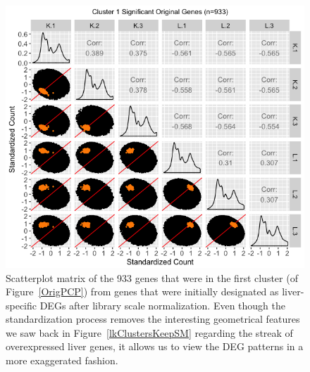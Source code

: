 \documentclass{article}
\begin{document}
\null
\begin{figure}[t!]
\centerline{\includegraphics[width=1\columnwidth]{../MakeFigures/lkClustersOrigSM-St.jpg}}
\caption{Scatterplot matrix of the 933 genes that were in the first cluster (of Figure~\ref{OrigPCP}) from genes that were initially designated as liver-specific DEGs after library scale normalization. Even though the standardization process removes the interesting geometrical features we saw back in Figure~\ref{lkClustersKeepSM} regarding the streak of overexpressed liver genes, it allows us to view the DEG patterns in a more exaggerated fashion.
\label{lkClustersOrigSM-St}}
\end{figure}
\end{document}
